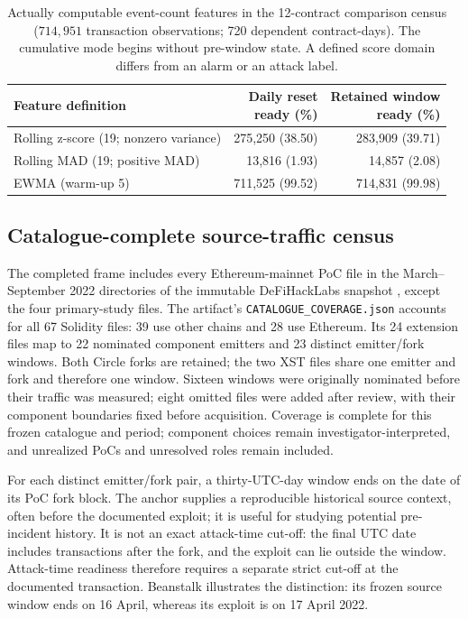 \documentclass[preprint,12pt,authoryear]{elsarticle}
\begin{document}
\begin{table}[htbp]
\centering\small
\caption{Actually computable event-count features in the 12-contract comparison census ($714{,}951$ transaction observations; 720 dependent contract-days). The cumulative mode begins without pre-window state. A defined score domain differs from an alarm or an attack label.}
\label{tab:runtime}
\begin{tabularx}{\linewidth}{@{}>{\raggedright\arraybackslash}X r r@{}}
\toprule
Feature definition & \shortstack{Daily reset\\ready (\%)} & \shortstack{Retained window\\ready (\%)}\\
\midrule
Rolling z-score (19; nonzero variance) & 275,250 (38.50) & 283,909 (39.71)\\
Rolling MAD (19; positive MAD) & 13,816 (1.93) & 14,857 (2.08)\\
EWMA (warm-up 5) & 711,525 (99.52) & 714,831 (99.98)\\
\bottomrule
\end{tabularx}
\end{table}

\subsection{Catalogue-complete source-traffic census}\label{sec:sourcecensus}
The completed frame includes every Ethereum-mainnet PoC file in the March--September 2022 directories of the immutable DeFiHackLabs snapshot \citep{DeFiHackLabs2026}, except the four primary-study files. The artifact's \texttt{CATALOGUE\_COVERAGE.json} accounts for all 67 Solidity files: 39 use other chains and 28 use Ethereum. Its 24 extension files map to 22 nominated component emitters and 23 distinct emitter/fork windows. Both Circle forks are retained; the two XST files share one emitter and fork and therefore one window. Sixteen windows were originally nominated before their traffic was measured; eight omitted files were added after review, with their component boundaries fixed before acquisition. Coverage is complete for this frozen catalogue and period; component choices remain investigator-interpreted, and unrealized PoCs and unresolved roles remain included.

For each distinct emitter/fork pair, a thirty-UTC-day window ends on the date of its PoC fork block. The anchor supplies a reproducible historical source context, often before the documented exploit; it is useful for studying potential pre-incident history. It is not an exact attack-time cut-off: the final UTC date includes transactions after the fork, and the exploit can lie outside the window. Attack-time readiness therefore requires a separate strict cut-off at the documented transaction. Beanstalk illustrates the distinction: its frozen source window ends on 16 April, whereas its exploit is on 17 April 2022.
\end{document}
